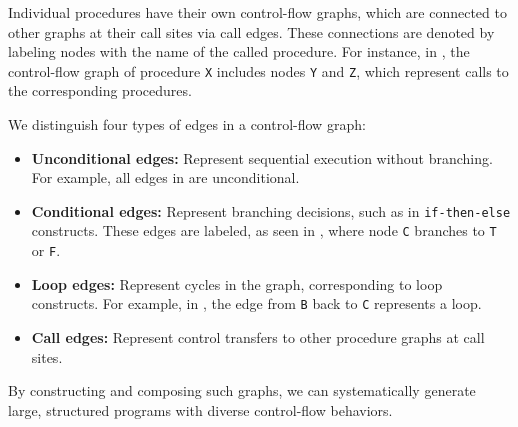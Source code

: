 \documentclass[conference]{IEEEtran}
\def\<#1>{\texttt{#1}}
\begin{document}
Individual procedures have their own control-flow graphs, which are connected to other graphs at their call sites via call edges. These connections are denoted by labeling nodes with the name of the called procedure. For instance, in , the control-flow graph of procedure \<X> includes nodes \<Y> and \<Z>, which represent calls to the corresponding procedures.

We distinguish four types of edges in a control-flow graph:
\begin{itemize}
\item \textbf{Unconditional edges:} Represent sequential execution without branching. For example, all edges in  are unconditional.
\item \textbf{Conditional edges:} Represent branching decisions, such as in \<if-then-else> constructs. These edges are labeled, as seen in , where node \<C> branches to \<T> or \<F>.
\item \textbf{Loop edges:} Represent cycles in the graph, corresponding to loop constructs. For example, in , the edge from \<B> back to \<C> represents a loop.
\item \textbf{Call edges:} Represent control transfers to other procedure graphs at call sites.
\end{itemize}
By constructing and composing such graphs, we can systematically generate large, structured programs with diverse control-flow behaviors.

% 
% 
% 
\end{document}
